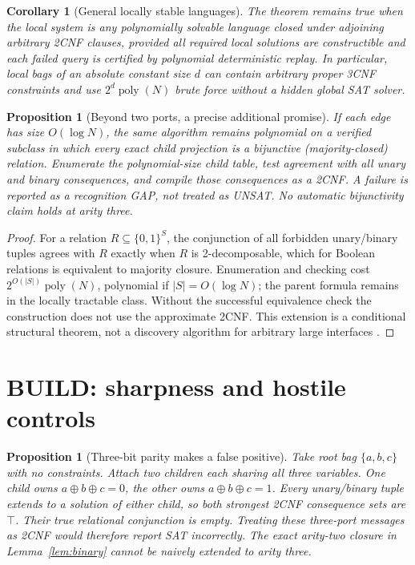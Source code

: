 \documentclass[11pt]{article}
\newtheorem{corollary}[theorem]{Corollary}
\newtheorem{proposition}[theorem]{Proposition}
\begin{document}
\begin{corollary}[General locally stable languages]
The theorem remains true when the local system is any polynomially solvable
language closed under adjoining arbitrary 2CNF clauses, provided all
required local solutions are constructible and each failed query is certified
by polynomial deterministic replay. In particular, local bags of an absolute
constant size $d$ can contain arbitrary proper 3CNF constraints and use
$2^d\operatorname{poly}(N)$ brute force without a hidden global SAT solver.
\end{corollary}

\begin{proposition}[Beyond two ports, a precise additional promise]
If each edge has size $O(\log N)$, the same algorithm remains polynomial on
a \emph{verified} subclass in which every exact child projection is a
bijunctive (majority-closed) relation. Enumerate the polynomial-size child
table, test agreement with all unary and binary consequences, and compile
those consequences as a 2CNF. A failure is reported as a recognition GAP,
not treated as UNSAT. No automatic bijunctivity claim holds at arity three.
\end{proposition}
\begin{proof}
For a relation $R\subseteq\{0,1\}^S$, the conjunction of all forbidden
unary/binary tuples agrees with $R$ exactly when $R$ is 2-decomposable, which
for Boolean relations is equivalent to majority closure. Enumeration and
checking cost $2^{O(|S|)}\operatorname{poly}(N)$, polynomial if
$|S|=O(\log N)$; the parent formula remains in the locally tractable class.
Without the successful equivalence check the construction does not use the
approximate 2CNF. This extension is a conditional structural theorem, not
a discovery algorithm for arbitrary large interfaces \cite{schaefer1978}.
\end{proof}

\section{BUILD: sharpness and hostile controls}
\begin{proposition}[Three-bit parity makes a false positive]
Take root bag $\{a,b,c\}$ with no constraints. Attach two children each
sharing all three variables. One child owns $a\oplus b\oplus c=0$, the
other owns $a\oplus b\oplus c=1$. Every unary/binary tuple extends to
a solution of either child, so both strongest 2CNF consequence sets are
$\top$. Their true relational conjunction is empty. Treating these
three-port messages as 2CNF would therefore report SAT incorrectly. The
exact arity-two closure in Lemma~\ref{lem:binary} cannot be naively
extended to arity three.
\end{proposition}
\end{document}
